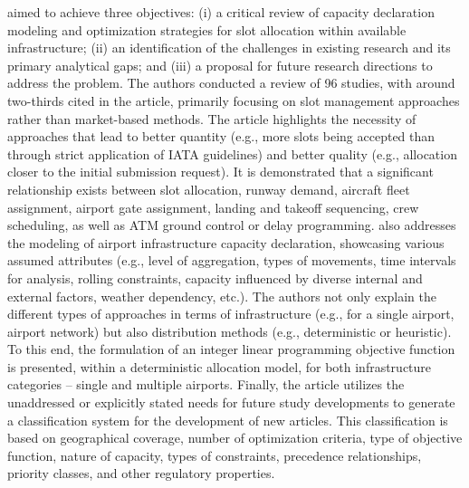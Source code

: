  aimed to achieve three objectives: (i) a
critical review of capacity declaration modeling and optimization strategies for
slot allocation within available infrastructure; (ii) an identification of the
challenges in existing research and its primary analytical gaps; and (iii) a
proposal for future research directions to address the problem.
%
The authors conducted a review of 96 studies, with around two-thirds cited in
the article, primarily focusing on slot management approaches rather than
market-based methods.
%
The article highlights the necessity of approaches that lead to better quantity
(e.g., more slots being accepted than through strict application of
\acrshort{IATA} guidelines) and better quality (e.g., allocation closer to the
initial submission request).
%
It is demonstrated that a significant relationship exists between slot
allocation, runway demand, aircraft fleet assignment, airport gate assignment,
landing and takeoff sequencing, crew scheduling, as well as \acrshort{ATM}
ground control or delay programming.
%
 also addresses the modeling of airport
infrastructure capacity declaration, showcasing various assumed attributes
(e.g., level of aggregation, types of movements, time intervals for analysis,
rolling constraints, capacity influenced by diverse internal and external
factors, weather dependency, etc.).
%
The authors not only explain the different types of approaches in terms of
infrastructure (e.g., for a single airport, airport network) but also
distribution methods (e.g., deterministic or heuristic).
%
To this end, the formulation of an integer linear programming objective function
is presented, within a deterministic allocation model, for both infrastructure
categories – single and multiple airports.
%
Finally, the article utilizes the unaddressed or explicitly stated needs for
future study developments to generate a classification system for the
development of new articles.
%
This classification is based on geographical coverage, number of optimization
criteria, type of objective function, nature of capacity, types of constraints,
precedence relationships, priority classes, and other regulatory properties.



